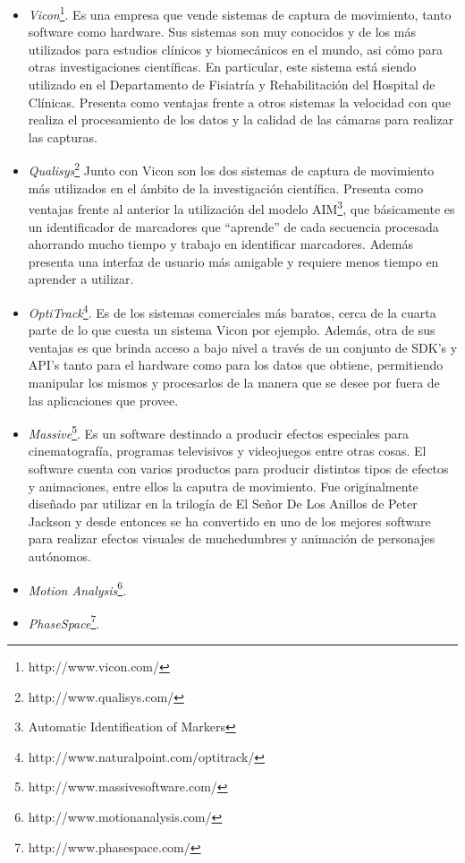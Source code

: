 \begin{itemize}
\item \emph{Vicon}\footnote{http://www.vicon.com/}. Es una empresa que vende sistemas de captura de movimiento, tanto software como hardware. Sus sistemas son muy conocidos y de los más utilizados para estudios clínicos y biomecánicos en el mundo, asi cómo para otras investigaciones científicas. En particular, este sistema está siendo utilizado en el Departamento de Fisiatría y Rehabilitación del Hospital de Clínicas. Presenta como ventajas frente a otros sistemas la velocidad con que realiza el procesamiento de los datos y la calidad de las cámaras para realizar las capturas.
\item \emph{Qualisys}\footnote{http://www.qualisys.com/} Junto con Vicon son los dos sistemas de captura de movimiento más utilizados en el ámbito de la investigación científica. Presenta como ventajas frente al anterior la utilización del modelo AIM\footnote{Automatic Identification of Markers}, que básicamente es un identificador de marcadores que ``aprende'' de cada secuencia procesada ahorrando mucho tiempo y trabajo en identificar marcadores. Además presenta una interfaz de usuario más amigable y requiere menos tiempo en aprender a utilizar.
\item \emph{OptiTrack}\footnote{http://www.naturalpoint.com/optitrack/}. Es de los sistemas comerciales más baratos, cerca de la cuarta parte de lo que cuesta un sistema Vicon por ejemplo. Además, otra de sus ventajas es que brinda acceso a bajo nivel a través de un conjunto de  SDK's y API's tanto para el hardware como para los datos que obtiene, permitiendo manipular los mismos y procesarlos de la manera que se desee por fuera de las aplicaciones que provee. 
\item \emph{Massive}\footnote{http://www.massivesoftware.com/}. Es un software destinado a producir efectos especiales para cinematografía, programas televisivos y videojuegos entre otras cosas. El software cuenta con varios productos para producir distintos tipos de efectos y animaciones, entre ellos la caputra de movimiento. Fue originalmente diseñado par utilizar en la trilogía de El Señor De Los Anillos de Peter Jackson y desde entonces se ha convertido en uno de los mejores software para realizar efectos visuales de muchedumbres y animación de personajes autónomos.
\item \emph{Motion Analysis}\footnote{http://www.motionanalysis.com/}.
\item \emph{PhaseSpace}\footnote{http://www.phasespace.com/}.
\end{itemize}


